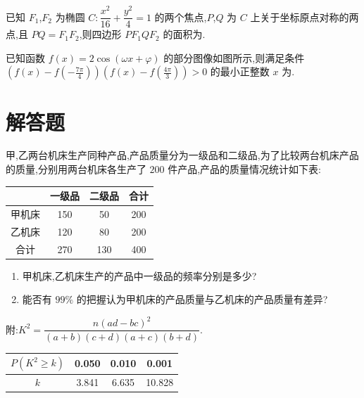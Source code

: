 \begin{problem}
已知 \(F_1\),\(F_2\) 为椭圆 \(C:\dfrac{x^2}{16}+\dfrac{y^2}{4}=1\) 的两个焦点,\(P\),\(Q\) 为 \(C\) 上关于坐标原点对称的两点,且 \(PQ=F_1F_2\),则四边形 \(PF_1QF_2\) 的面积为\fillinblank{}.

\end{problem}

\begin{problem}
已知函数 \(f(x)=2\cos (\omega x+\varphi)\) 的部分图像如图所示,则满足条件 \(\left( f(x)-f\left( -\frac{7\pi}{4} \right) \right)\allowbreak\left( f(x)-f\left( \frac{4\pi}{3} \right) \right)>0\) 的最小正整数 \(x\) 为\fillinblank{}.


\end{problem}

\section{解答题}

\begin{problem}
甲,乙两台机床生产同种产品,产品质量分为一级品和二级品,为了比较两台机床产品的质量,分别用两台机床各生产了 \(200\) 件产品,产品的质量情况统计如下表:

\begin{center}
\begin{tabular}{c|ccc}
\hline
& 一级品 & 二级品 & 合计 \\
\hline
甲机床 & 150 & 50 & 200 \\
乙机床 & 120 & 80 & 200 \\
合计 & 270 & 130 & 400 \\
\hline
\end{tabular}
\end{center}

\begin{enumerate}
\item 甲机床,乙机床生产的产品中一级品的频率分别是多少?
\item 能否有 \(99\%\) 的把握认为甲机床的产品质量与乙机床的产品质量有差异?
\end{enumerate}

附:\(K^2=\dfrac{n(ad-bc)^2}{(a+b)(c+d)(a+c)(b+d)}\).

\begin{center}
\begin{tabular}{c|ccc}
\hline
\(P(K^2\ge k)\) & 0.050 & 0.010 & 0.001 \\
\hline
\(k\) & 3.841 & 6.635 & 10.828 \\
\hline
\end{tabular}
\end{center}
\end{problem}

